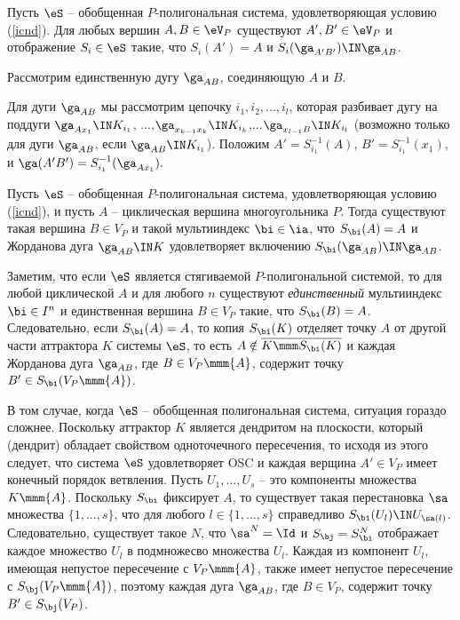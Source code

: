\begin{lemma}
Пусть $\eS$ -- обобщенная $P$-полигональная система,  удовлетворяющая условию (\ref{icnd}). Для любых вершин $A,B\in \eV_P$ существуют $A', B'\in \eV_P$ и отображение $S_i\in \eS$ такие, что $S_i(A')=A$ и $S_i(\ga_{A'B'})\IN\ga_{AB}$.
\end{lemma}

\dok Рассмотрим единственную дугу $\ga_{AB}$, соединяющую $A$ и $B$.

Для дуги $\ga_{AB}$ мы рассмотрим цепочку $i_1,i_2,...,i_l$,  которая разбивает дугу на поддуги  $\ga_{Ax_1}\IN K_{i_1}$, ...,$\ga_{x_{k-1}x_k}\IN K_{i_k}$,...$\ga_{x_{l-1}B}\IN K_{i_l}$ (возможно только для дуги $\ga_{AB}$, если $\ga_{AB}\IN K_{i_1}$).  Положим $A'=S_{i_1}^{-1}(A)$, $B'= S_{i_1}^{-1}(x_1)$, и $\ga(A'B')=S_{i_1}^{-1}(\ga_{Ax_1}).$\vse

\begin{prop}\label{fixparc}
Пусть $\eS$ -- обобщенная $P$-полигональная система, удовлетворяющая условию (\ref{icnd}), и пусть $A$ -- циклическая вершина многоугольника $P$. Тогда существуют такая вершина $B\in V_{P}$ и такой мультииндекс $\bi\in \ia$, что  $S_{\bi}(A)=A$  и Жорданова дуга $\ga_{AB}\IN K$ удовлетворяет включению $S_{\bi}(\ga_{AB})\IN\ga_{AB}$.
\end{prop}

\dok 
Заметим, что если $\eS$ является стягиваемой $P$-по\-ли\-го\-нальной системой, то для любой циклической $A$ и для любого $n$ существуют {\em единственный} мультииндекс $\bi\in I^n$ и единственная вершина $B\in V_P$ такие, что $S_\bi(B)=A$. Следовательно, если $S_\bi(A)=A$, то копия $S_\bi(K)$ отделяет точку $A$ от другой части аттрактора $K$ системы  $\eS$, то есть $A\notin \overline{K\mmm S_\bi(K)}$ и каждая Жорданова дуга $\ga_{AB}$, где $B\in V_P\mmm\{A\}$, содержит точку $B'\in S_\bi(V_P\mmm \{A\})$.

В том случае, когда $\eS$ -- обобщенная полигональная система, ситуация гораздо сложнее. Поскольку аттрактор $K$ является дендритом на плоскости, который (дендрит) обладает свойством одноточечного пересечения, то исходя из этого следует, что система $\eS$ удовлетворяет OSC и каждая верщина $A'\in V_P$ имеет конечный порядок ветвления. Пусть $U_1,...,U_s$ -- это компоненты множества $K\mmm\{A\}$. Поскольку $S_\bi$ фиксирует $A$, то существует такая перестановка $\sa$ множества $\{1,...,s\}$, что для любого $l\in\{1,...,s\}$ справедливо $S_\bi(U_l)\IN U_{\sa(l)}$. Следовательно, существует такое $N$, что $\sa^N=\Id$ и $S_\bj=S_\bi^N$ отображает каждое множество $U_l$ в подмножесво множества $U_l$. Каждая из компонент  $U_l$, имеющая непустое пересечение с $V_P\mmm\{A\}$, также имеет непустое пересечение с $S_\bj(V_P\mmm \{A\})$, поэтому каждая дуга  $\ga_{AB}$, где $B\in V_P$, содержит точку $B'\in S_\bj(V_P)$. \\


